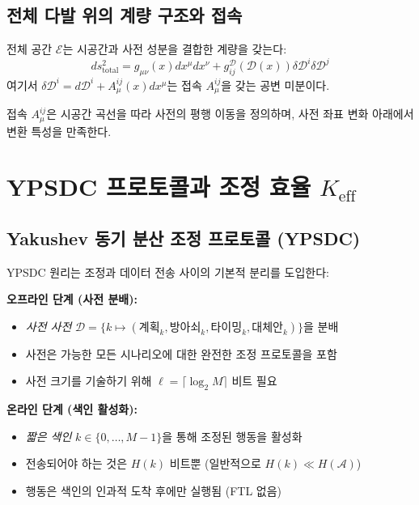 \documentclass[11pt,a4paper]{article}
\begin{document}
	\subsection{전체 다발 위의 계량 구조와 접속}
	전체 공간 $\mathcal{E}$는 시공간과 사전 성분을 결합한 계량을 갖는다:
	\begin{equation}
		ds^2_{\text{total}} = g_{\mu\nu}(x) dx^\mu dx^\nu + g_{ij}^{\mathcal{D}}(\mathcal{D}(x)) \delta\mathcal{D}^i \delta\mathcal{D}^j
	\end{equation}
	여기서 $\delta\mathcal{D}^i = d\mathcal{D}^i + A_\mu^{ij}(x) dx^\mu$는 접속 $A_\mu^{ij}$을 갖는 공변 미분이다.
	
	접속 $A_\mu^{ij}$은 시공간 곡선을 따라 사전의 평행 이동을 정의하며, 사전 좌표 변화 아래에서 변환 특성을 만족한다.
	
	\section{YPSDC 프로토콜과 조정 효율 \texorpdfstring{$K_{\mathrm{eff}}$}{K_eff}}
	
	\subsection{Yakushev 동기 분산 조정 프로토콜 (YPSDC)}
	YPSDC 원리는 조정과 데이터 전송 사이의 기본적 분리를 도입한다:
	
	\begin{tcolorbox}[title=YPSDC 원리, colback=blue!5!white, colframe=blue!50!black]
		\textbf{오프라인 단계 (사전 분배):}
		\begin{itemize}
			\item \emph{사전 사전} $\mathcal{D} = \{k \mapsto (\text{계획}_k, \text{방아쇠}_k, \text{타이밍}_k, \text{대체안}_k)\}$을 분배
			\item 사전은 가능한 모든 시나리오에 대한 완전한 조정 프로토콜을 포함
			\item 사전 크기를 기술하기 위해 $\ell = \lceil \log_2 M \rceil$ 비트 필요
		\end{itemize}
		
		\textbf{온라인 단계 (색인 활성화):}
		\begin{itemize}
			\item \emph{짧은 색인} $k \in \{0, \dots, M-1\}$을 통해 조정된 행동을 활성화
			\item 전송되어야 하는 것은 $H(k)$ 비트뿐 (일반적으로 $H(k) \ll H(\mathcal{A})$)
			\item 행동은 색인의 인과적 도착 후에만 실행됨 (FTL 없음)
		\end{itemize}
	\end{tcolorbox}
	
\end{document}

